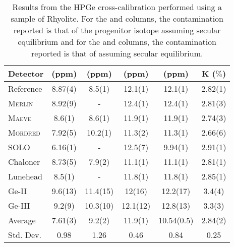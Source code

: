 \begin{table}[t!]
\centering
\vspace{-5mm}
\caption{Results from the HPGe cross-calibration performed using a sample of Rhyolite. For the \utTeE{} and \utTeL{} columns, the contamination reported is that of the progenitor isotope \utTe{} assuming secular equilibrium and for the \thtTtE{} and \thtTtL{} columns, the contamination reported is that of \thtTt{} assuming secular equilibrium.}
    \label{tab:GeCrossCal}
    \renewcommand{\arraystretch}{1.1}
    \begin{tabular}{lccccc}
    
    \textbf{Detector} & %
    \textbf{\utTeE{} (ppm)}  & %
    \textbf{\utTeL{} (ppm)} &  %
    \textbf{\thtTtE{} (ppm)} &  %
    \textbf{\thtTtL{} (ppm)}  & %
    \textbf{K ($\%$)}   \\  %
    
    \hline
    \hline
    
    Reference & 8.87(4) & 8.5(1) & 12.1(1) & 12.1(1) & 2.82(1) \\
    
    \hline
   
    \textsc{Merlin} & 8.92(9) & - & 12.4(1) & 12.4(1) & 2.81(3) \\
    \textsc{Maeve} & 8.6(1) & 8.6(1) & 11.9(1) & 11.9(1) & 2.74(3) \\
    \textsc{Mordred} & 7.92(5) & 10.2(1) & 11.3(2) & 11.3(1) & 2.66(6) \\
    SOLO & 6.16(1) & - & 12.5(7) & 9.94(1) & 2.91(1) \\
    Chaloner & 8.73(5) & 7.9(2) & 11.1(1) & 11.1(1) & 2.81(1) \\
    Lunehead & 8.5(1) & - & 11.8(1) & 11.8(1) & 2.85(1) \\
    Ge-II & 9.6(13) & 11.4(15) & 12(16) & 12.2(17) & 3.4(4) \\
    Ge-III & 9.2(9) & 10.3(10) & 12.1(12) & 12.8(13) & 3.3(3) \\
   
    \hline
   
    Average & 7.61(3) & 9.2(2) & 11.9(1) & 10.54(0.5) & 2.84(2) \\
    Std. Dev. & 0.98 & 1.26 & 0.46 & 0.84 & 0.25 \\
    
    \bottomrule
\end{tabular}
\end{table}